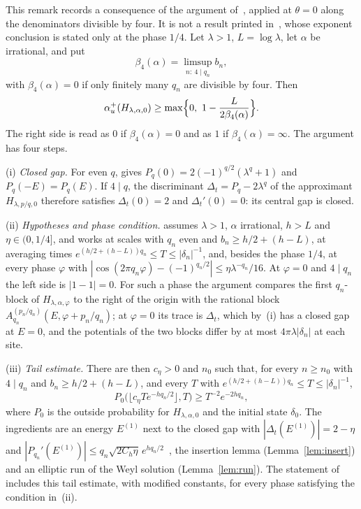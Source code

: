 \begin{remark}\label{rem:phasezero}
This remark records a consequence of the argument of~\cite[Theorem~7.5]{DMworstcase}, applied at $\theta=0$ along the denominators divisible by four. It is not a result printed in~\cite{DMworstcase}, whose exponent conclusion is stated only at the phase $1/4$. Let $\lambda>1$, $L=\log\lambda$, let $\alpha$ be irrational, and put
\[
\beta_4(\alpha)=\limsup_{n:\ 4\mid q_n}b_n ,
\]
with $\beta_4(\alpha)=0$ if only finitely many $q_n$ are divisible by four. Then
\[
\au(H_{\lambda,\alpha,0})\ge\max\Bigl\{0,\ 1-\frac{L}{2\beta_4(\alpha)}\Bigr\}.
\]
The right side is read as $0$ if $\beta_4(\alpha)=0$ and as $1$ if $\beta_4(\alpha)=\infty$. The argument has four steps.

(i) \emph{Closed gap.} For even $q$, \cite[Corollary~7.2]{DMworstcase} gives $P_q(0)=2(-1)^{q/2}(\lambda^q+1)$ and $P_q(-E)=P_q(E)$. If $4\mid q$, the discriminant $\Delta_t=P_q-2\lambda^q$ of the approximant $H_{\lambda,p/q,0}$ therefore satisfies $\Delta_t(0)=2$ and $\Delta_t'(0)=0$: its central gap is closed.

(ii) \emph{Hypotheses and phase condition.} \cite[Theorem~7.5]{DMworstcase} assumes $\lambda>1$, $\alpha$ irrational, $h>L$ and $\eta\in(0,1/4]$, and works at scales with $q_n$ even and $b_n\ge h/2+(h-L)$, at averaging times $e^{(h/2+(h-L))q_n}\le T\le|\delta_n|^{-1}$, and, besides the phase $1/4$, at every phase $\varphi$ with $|\cos(2\pi q_n\varphi)-(-1)^{q_n/2}|\le\eta\lambda^{-q_n}/16$. At $\varphi=0$ and $4\mid q_n$ the left side is $|1-1|=0$. For such a phase the argument compares the first $q_n$-block of $H_{\lambda,\alpha,\varphi}$ to the right of the origin with the rational block $A^{(p_n/q_n)}_{q_n}(E,\varphi+p_n/q_n)$; at $\varphi=0$ its trace is $\Delta_t$, which by~(i) has a closed gap at $E=0$, and the potentials of the two blocks differ by at most $4\pi\lambda|\delta_n|$ at each site.

(iii) \emph{Tail estimate.} There are then $c_\eta>0$ and $n_0$ such that, for every $n\ge n_0$ with $4\mid q_n$ and $b_n\ge h/2+(h-L)$, and every $T$ with $e^{(h/2+(h-L))q_n}\le T\le|\delta_n|^{-1}$,
\[
P_0\bigl(\lfloor c_\eta Te^{-hq_n/2}\rfloor,T\bigr)\ge T^{-2}e^{-2hq_n},
\]
where $P_0$ is the outside probability for $H_{\lambda,\alpha,0}$ and the initial state $\delta_0$. The ingredients are an energy $E^{(1)}$ next to the closed gap with $|\Delta_t(E^{(1)})|=2-\eta$ and $|P_{q_n}'(E^{(1)})|\le q_n\sqrt{2C_h\eta}\,e^{hq_n/2}$~\cite[Proposition~7.4]{DMworstcase}, the insertion lemma (Lemma~\ref{lem:insert}) and an elliptic run of the Weyl solution (Lemma~\ref{lem:run}). The statement of~\cite[Theorem~7.5]{DMworstcase} includes this tail estimate, with modified constants, for every phase satisfying the condition in~(ii).


\end{remark}
